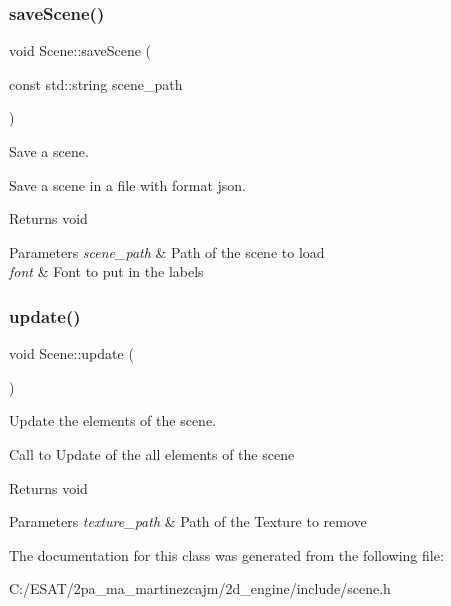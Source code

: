 \subsubsection{\texorpdfstring{save\+Scene()}{saveScene()}}
{\footnotesize\ttfamily void Scene\+::save\+Scene (\begin{DoxyParamCaption}\item[{const std\+::string}]{scene\+\_\+path }\end{DoxyParamCaption})}



Save a scene. 

Save a scene in a file with format json.

\begin{DoxyReturn}{Returns}
void 
\end{DoxyReturn}

\begin{DoxyParams}{Parameters}
{\em scene\+\_\+path} & Path of the scene to load \\
\hline
{\em font} & Font to put in the labels \\
\hline
\end{DoxyParams}
\mbox{\label{class_scene_aa24c7e636c10e4e42650c1374b90bb80}} 
\subsubsection{\texorpdfstring{update()}{update()}}
{\footnotesize\ttfamily void Scene\+::update (\begin{DoxyParamCaption}{ }\end{DoxyParamCaption})}



Update the elements of the scene. 

Call to Update of the all elements of the scene

\begin{DoxyReturn}{Returns}
void 
\end{DoxyReturn}

\begin{DoxyParams}{Parameters}
{\em texture\+\_\+path} & Path of the Texture to remove \\
\hline
\end{DoxyParams}


The documentation for this class was generated from the following file\+:\begin{DoxyCompactItemize}
\item 
C\+:/\+E\+S\+A\+T/2pa\+\_\+ma\+\_\+martinezcajm/2d\+\_\+engine/include/scene.\+h\end{DoxyCompactItemize}
